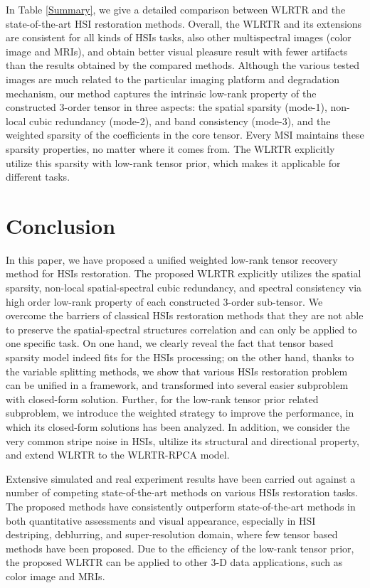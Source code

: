 \documentclass[twocolumn]{svjour3}          %
\begin{document}
    In Table \ref{Summary}, we give a detailed comparison between WLRTR and the state-of-the-art HSI restoration methods. Overall, the WLRTR and its extensions are consistent for all kinds of HSIs tasks, also other multispectral images (color image and MRIs), and obtain better visual pleasure result with fewer artifacts than the results obtained by the compared methods. Although the various tested images are much related to the particular imaging platform and degradation mechanism, our method captures the intrinsic low-rank property of the constructed  3-order tensor in three aspects: the spatial sparsity (mode-1), non-local cubic redundancy (mode-2), and band consistency (mode-3), and the weighted sparsity of the coefficients in the core tensor. Every MSI maintains these sparsity properties, no matter where it comes from. The WLRTR explicitly utilize this sparsity with low-rank tensor prior, which makes it applicable for different tasks.


\section{Conclusion}

    In this paper, we have proposed a unified weighted low-rank tensor recovery method for HSIs restoration. The proposed WLRTR explicitly utilizes the spatial sparsity, non-local spatial-spectral cubic redundancy, and spectral consistency via high order low-rank property of each constructed 3-order sub-tensor. We overcome the barriers of classical HSIs restoration methods that they are not able to preserve the spatial-spectral structures correlation and can only be applied to one specific task. On one hand, we clearly reveal the fact that tensor based sparsity model indeed fits for the HSIs processing; on the other hand, thanks to the variable splitting methods, we show that various HSIs restoration problem can be unified in a framework, and transformed into several easier subproblem with closed-form solution. Further, for the low-rank tensor prior related subproblem, we introduce the weighted strategy to improve the performance, in which its closed-form solutions has been analyzed. In addition, we consider the very common stripe noise in HSIs, ultilize its structural and directional property, and extend WLRTR to the WLRTR-RPCA model.

    Extensive simulated and real experiment results have been carried out against a number of competing state-of-the-art methods on various HSIs restoration tasks. The proposed methods have consistently outperform state-of-the-art methods in both quantitative assessments and visual appearance, especially in HSI destriping, deblurring, and super-resolution domain, where few tensor based methods have been proposed. Due to the efficiency of the low-rank tensor prior, the proposed WLRTR can be applied to other 3-D data applications, such as color image and MRIs.
\end{document}
